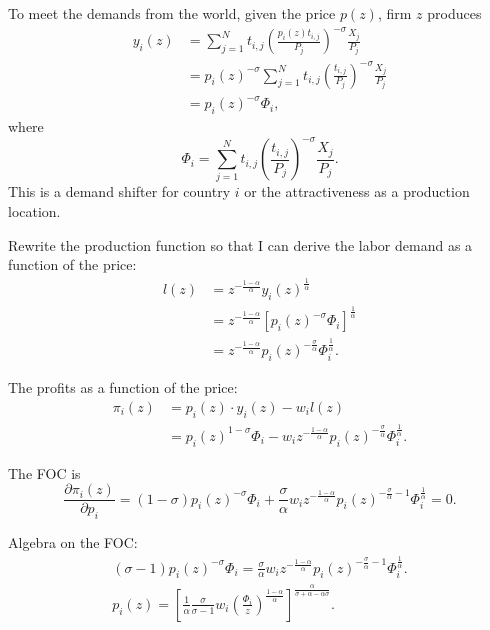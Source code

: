 \documentclass[12pt,letterpaper]{article}
\begin{document}
To meet the demands from the world, given the price $p(z)$, firm $z$ produces
\begin{equation}
\begin{split}
    y_{i}(z) &= \sum_{j=1}^{N}t_{i,j}\left(\frac{p_{i}(z)t_{i,j}}{P_{j}}
    \right)^{-\sigma}\frac{X_{j}}{P_{j}}\\
    &= p_{i}(z)^{-\sigma}\sum_{j=1}^{N}t_{i,j}\left(\frac{t_{i,j}}{P_{j}} \right)^{-\sigma}\frac{X_{j}}{P_{j}}\\
    &= p_{i}(z)^{-\sigma}\Phi_{i},
\end{split}\end{equation}
where
\begin{equation}
    \Phi_{i}=\sum_{j=1}^{N}t_{i,j}\left(\frac{t_{i,j}}{P_{j}} \right)^{-\sigma}\frac{X_{j}}{P_{j}}.
\end{equation}
This is a demand shifter for country $i$ or the attractiveness as a production location.\par

Rewrite the production function so that I can derive the labor demand as a function of the price:
\begin{equation}
\begin{split}
l(z)&=z^{-\frac{1-\alpha}{\alpha}}y_{i}(z)^{\frac{1}{\alpha}}\\
&=z^{-\frac{1-\alpha}{\alpha}}[p_{i}(z)^{-\sigma}\Phi_{i}]^{\frac{1}{\alpha}}\\
&=z^{-\frac{1-\alpha}{\alpha}}p_{i}(z)^{-\frac{\sigma}{\alpha}}\Phi_{i}^{\frac{1}{\alpha}}.
\end{split}
\end{equation}

The profits as a function of the price:
\begin{equation}
\begin{split}
    \pi_{i}(z)&=p_{i}(z)\cdot y_{i}(z)-w_{i}l(z)\\
    &=p_{i}(z)^{1-\sigma}\Phi_{i}-w_{i}z^{-\frac{1-\alpha}{\alpha}}p_{i}(z)^{-\frac{\sigma}{\alpha}}\Phi_{i}^{\frac{1}{\alpha}}.
\end{split}
\end{equation}

The FOC is
\begin{equation}
    \frac{\partial \pi_{i}(z)}{\partial p_{i}}=(1-\sigma)p_{i}(z)^{-\sigma}\Phi_{i}+\frac{\sigma}{\alpha}w_{i}z^{-\frac{1-\alpha}{\alpha}}p_{i}(z)^{-\frac{\sigma}{\alpha}-1}\Phi_{i}^{\frac{1}{\alpha}}=0.
\end{equation}

Algebra on the FOC:
\begin{align}
    (\sigma-1)p_{i}(z)^{-\sigma}\Phi_{i}=\frac{\sigma}{\alpha}w_{i}z^{-\frac{1-\alpha}{\alpha}}p_{i}(z)^{-\frac{\sigma}{\alpha}-1}\Phi_{i}^{\frac{1}{\alpha}}.\\
    p_{i}(z)=\left[\frac{1}{\alpha}\frac{\sigma}{\sigma-1}w_{i}\left(\frac{\Phi_{i}}{z} \right)^{\frac{1-\alpha}{\alpha}} \right]^{\frac{\alpha}{\sigma+\alpha-\alpha\sigma}}. \label{eq: optimal price}
\end{align}
\end{document}
